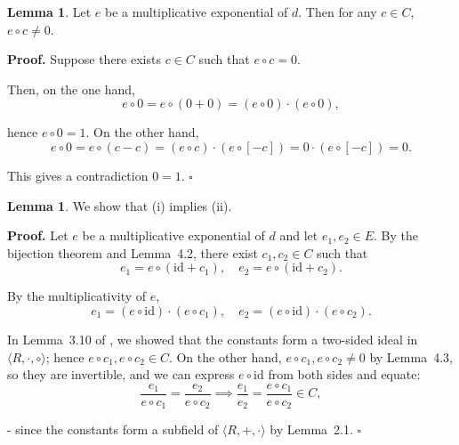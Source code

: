 \documentclass[12pt]{article}
\theoremstyle{definition}
\newtheorem{lemma}[definition]{Lemma}
\begin{document}
\vspace{10pt}
\begin{lemma}
Let \(e\) be a multiplicative exponential of \(d\). Then for any \(c \in C\), \(e \circ c \neq 0\).

\vspace{5pt}
\textbf{Proof.} Suppose there exists \(c \in C\) such that \(e \circ c = 0\). 

Then, on the one hand,
\[
e \circ 0 = e \circ (0 + 0) = (e \circ 0) \cdot (e \circ 0),
\]

hence \(e \circ 0 = 1\). On the other hand,
\[
e \circ 0 = e \circ (c - c) = (e \circ c) \cdot (e \circ [-c]) = 0 \cdot (e \circ [-c]) = 0.
\]

This gives a contradiction \(0 = 1\). $\square$
\end{lemma}

\vspace{10pt}
\begin{lemma}
We show that (i) implies (ii).

\vspace{10pt}
\textbf{Proof.} Let \(e\) be a multiplicative exponential of \(d\) and let \(e_1, e_2 \in E\). 
By the bijection theorem and Lemma~4.2, there exist \(c_1, c_2 \in C\) such that
\[
e_1 = e \circ (\mathrm{id} + c_1), \quad e_2 = e \circ (\mathrm{id} + c_2).
\]

By the multiplicativity of \(e\),
\[
e_1 = (e \circ \mathrm{id}) \cdot (e \circ c_1), \quad e_2 = (e \circ \mathrm{id}) \cdot (e \circ c_2).
\]

In Lemma~3.10 of \cite{umerov2025}, we showed that the constants form a two-sided ideal 
in \(\langle R, \cdot, \circ \rangle\); hence \(e \circ c_1, e \circ c_2 \in C\). 
On the other hand, \(e \circ c_1, e \circ c_2 \neq 0\) by Lemma~4.3, so they are invertible, 
and we can express \(e \circ \mathrm{id}\) from both sides and equate:
\[
\frac{e_1}{e \circ c_1} = \frac{e_2}{e \circ c_2} \implies \frac{e_1}{e_2} = \frac{e \circ c_1}{e \circ c_2} \in C,
\]

- since the constants form a subfield of \(\langle R, +, \cdot \rangle\) by Lemma~2.1. $\square$
\end{lemma}
\end{document}
